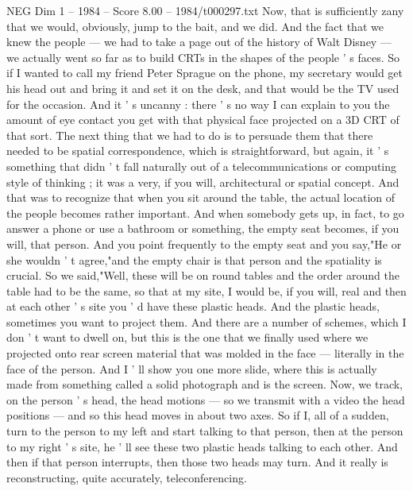 \begin{textsample}{NEG Dim 1 – 1984 – Score 8.00 – 1984/t000297.txt}
Now, that is sufficiently zany that we would, obviously, jump to the bait, and we did.
And the fact that we knew the people — we had to take a page out of the history of Walt Disney — we actually went so far as to build CRTs in the shapes of the people ' s faces.
So if I wanted to call my friend Peter Sprague on the phone, my secretary would get his head out and bring it and set it on the desk, and that would be the TV used for the occasion.
And it ' s uncanny : there ' s no way I can explain to you the amount of eye contact you get with that physical face projected on a 3D CRT of that sort.
The next thing that we had to do is to persuade them that there needed to be spatial correspondence, which is straightforward, but again, it ' s something that didn ' t fall naturally out of a telecommunications or computing style of thinking ; it was a very, if you will, architectural or spatial concept.
And that was to recognize that when you sit around the table, the actual location of the people becomes rather important.
And when somebody gets up, in fact, to go answer a phone or use a bathroom or something, the empty seat becomes, if you will, that person.
And you point frequently to the empty seat and you say,"He or she wouldn ' t agree,"and the empty chair is that person and the spatiality is crucial.
So we said,"Well, these will be on round tables and the order around the table had to be the same, so that at my site, I would be, if you will, real and then at each other ' s site you ' d have these plastic heads.
And the plastic heads, sometimes you want to project them.
And there are a number of schemes, which I don ' t want to dwell on, but this is the one that we finally used where we projected onto rear screen material that was molded in the face — literally in the face of the person.
And I ' ll show you one more slide, where this is actually made from something called a solid photograph and is the screen.
Now, we track, on the person ' s head, the head motions — so we transmit with a video the head positions — and so this head moves in about two axes.
So if I, all of a sudden, turn to the person to my left and start talking to that person, then at the person to my right ' s site, he ' ll see these two plastic heads talking to each other.
And then if that person interrupts, then those two heads may turn.
And it really is reconstructing, quite accurately, teleconferencing.

\end{textsample}
